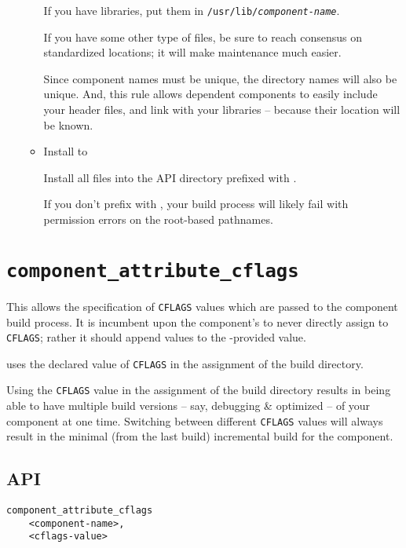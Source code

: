 \begin{itemize}
\begin{itemize}
      If you have libraries, put them in
      \texttt{/usr/lib/\emph{component-name}}.

      If you have some other type of files, be sure to reach consensus
      on standardized locations; it will make maintenance much easier.

      Since component names must be unique, the directory names will
      also be unique.  And, this rule allows dependent components to
      easily include your header files, and link with your libraries
      -- because their location will be known.

    \item Install to \destdir

      Install all files into the API directory prefixed with \destdir.

      If you don't prefix with \destdir, your build process will
      likely fail with permission errors on the root-based pathnames.

  \end{itemize}
\end{itemize}

\section{\texttt{component\_attribute\_cflags}}\label{api:cflags}

This allows the specification of \texttt{CFLAGS} values which are
passed to the component build process.  It is incumbent upon the
component's \makefile to never directly assign to \texttt{CFLAGS};
rather it should append values to the \lmsbw-provided value.

\lmsbw uses the declared value of \texttt{CFLAGS} in the assignment of
the build directory.

Using the \texttt{CFLAGS} value in the assignment of the build
directory results in being able to have multiple build versions --
say, debugging \& optimized -- of your component at one time.
Switching between different \texttt{CFLAGS} values will always result
in the minimal (from the last build) incremental build for the
component.

\subsection{API}

\begin{verbatim}
component_attribute_cflags
    <component-name>,
    <cflags-value>
\end{verbatim}

